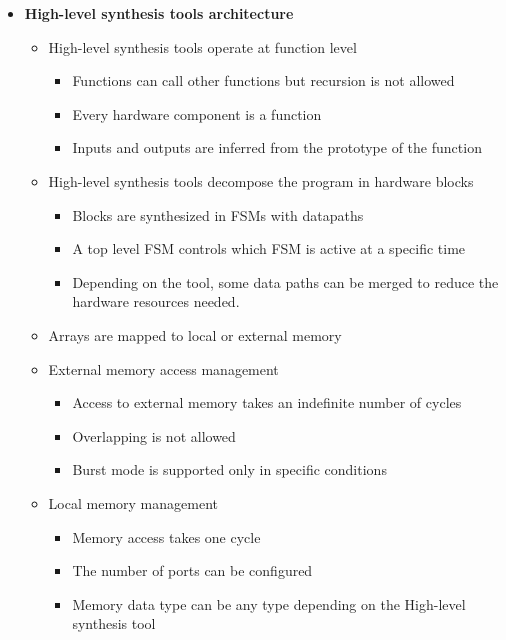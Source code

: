 \documentclass{cup-pan}
\begin{document}
\begin{itemize}
    \item  \textbf{High-level synthesis tools architecture}
    \begin{itemize}
        \item  High-level synthesis tools operate at function level
            \begin{itemize}
                \item  Functions can call other functions but recursion is not allowed
                \item  Every hardware component is a function
                \item  Inputs and outputs are inferred from the prototype of the function
            \end{itemize}
        \item  High-level synthesis tools decompose the program in hardware blocks
            \begin{itemize}
                \item  Blocks are synthesized in FSMs with datapaths
                \item  A top level FSM controls which FSM is active at a specific time
                \item  Depending on the tool, some data paths can be merged to reduce the hardware resources needed.
            \end{itemize}
        \item  Arrays are mapped to local or external memory
        \item  External memory access management
            \begin{itemize}
                \item  Access to external memory takes an indefinite number of cycles
                \item  Overlapping is not allowed
                \item  Burst mode is supported only in specific conditions
            \end{itemize}
        \item  Local memory management
            \begin{itemize}
                \item  Memory access takes one cycle
                \item  The number of ports can be configured
                \item  Memory data type can be any type depending on the High-level synthesis tool

\end{itemize}
\end{itemize}
\end{itemize}
\end{document}
